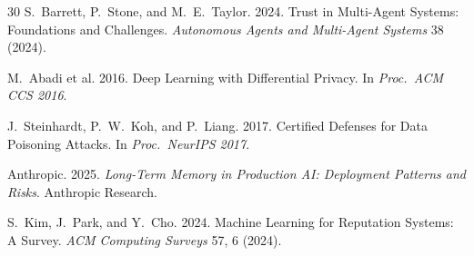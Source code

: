 \documentclass[sigconf,nonacm]{acmart}
\begin{document}
\begin{thebibliography}{30}
S.~Barrett, P.~Stone, and M.~E.~Taylor. 2024. Trust in
Multi-Agent Systems: Foundations and Challenges.
\textit{Autonomous Agents and Multi-Agent Systems} 38 (2024).

M.~Abadi et al. 2016. Deep Learning with Differential Privacy.
In \textit{Proc.\ ACM CCS 2016}.

J.~Steinhardt, P.~W.~Koh, and P.~Liang. 2017. Certified Defenses
for Data Poisoning Attacks. In \textit{Proc.\ NeurIPS 2017}.

Anthropic. 2025. \textit{Long-Term Memory in Production AI:
Deployment Patterns and Risks}. Anthropic Research.

S.~Kim, J.~Park, and Y.~Cho. 2024. Machine Learning for Reputation
Systems: A Survey. \textit{ACM Computing Surveys} 57, 6 (2024).

\end{thebibliography}
\end{document}
